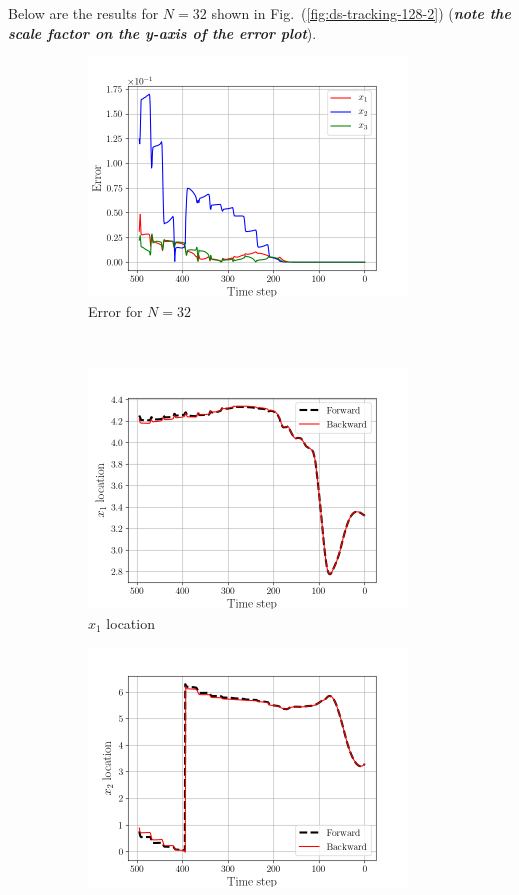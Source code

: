 Below are the results for $N=32$ shown in
Fig.~(\ref{fig:ds-tracking-128-2}) (\emph{\textbf{note the scale factor on the
y-axis of the error plot}}).
\begin{figure}[H]
    \begin{subfigure}[H]{0.45\textwidth}
        \includegraphics[height=2.5in]{media/rk4/DS-N-32/error-32.png}
        \caption{Error for $N=32$}
    \end{subfigure}
    ~
    \begin{subfigure}[H]{0.45\textwidth}
        \includegraphics[height=2.5in]{media/rk4/DS-N-32/x1-location.png}
        \caption{$x_{1}$ location}
    \end{subfigure}
    \newline
    \begin{subfigure}[H]{0.45\textwidth}
        \includegraphics[height=2.5in]{media/rk4/DS-N-32/x2-location.png}

\end{subfigure}
\end{figure}
